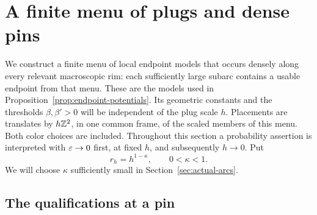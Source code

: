 \section{A finite menu of plugs and dense pins}\label{sec:pins}

We construct a finite menu of local endpoint models that occurs densely
along every relevant macroscopic rim: each sufficiently large subarc
contains a usable endpoint from that menu. These are the models used in
Proposition~\ref{prop:endpoint-potentials}.  Its geometric constants and the
thresholds $\beta,\beta'>0$ will be independent of the plug scale $h$.
Placements are translates by $h\mathbb Z^2$, in one common frame, of the scaled
members of this menu.  Both color choices are included.  Throughout this
section a probability assertion is interpreted with $\varepsilon\to0$ first, at
fixed $h$, and subsequently $h\to0$.  Put
\[
                    r_h=h^{1-\kappa},\qquad 0<\kappa<1.
\]
We will choose $\kappa$ sufficiently small in
Section~\ref{sec:actual-arcs}.

\subsection{The qualifications at a pin}

